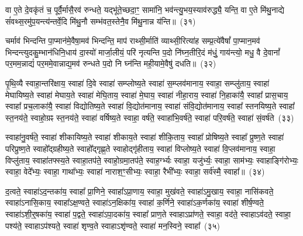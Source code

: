 वा ए॒ते दे॒वकृ॑तं च॒ पूर्वै॒र्मासै॒रव॑ रुन्धते॒ यद्भू॑ते॒च्छदा॒ꣳ॒ सामा॑नि॒ भव॑न्त्यु॒भय॒स्याव॑रुद्ध्यै॒ यन्ति॒ वा ए॒ते मि॑थु॒नाद्ये सं॑वथ्स॒रमु॑प॒यन्त्य॑न्तर्वे॒दि मि॑थु॒नौ सम्भ॑वत॒स्तेनै॒व मि॑थु॒नान्न य॑न्ति॥~(३१)\ip

{\anuvakamend[{व्यृ॑द्ध॒मक्षो॑धुका॒स्ताꣳ समां᳚ प्र॒जाः प॑र॒मामे॒व च॑ त्रि॒ꣳ॒शच्च॑}]}

चर्माव॑ भिन्दन्ति पा॒प्मान॑मे॒वैषा॒मव॑ भिन्दन्ति॒ माप॑ राथ्सी॒र्माति॑ व्याथ्सी॒रित्या॑ह सम्प्र॒त्ये॑वैषां᳚ पा॒प्मान॒मव॑ भिन्दन्त्युदकु॒म्भान॑धिनि॒धाय॑ दा॒स्यो॑ मार्जा॒लीयं॒ परि॑ नृत्यन्ति प॒दो नि॑घ्न॒तीरि॒दं म॑धुं॒ गाय॑न्त्यो॒ मधु॒ वै दे॒वानां᳚ पर॒मम॒न्नाद्यं॑ पर॒ममे॒वान्नाद्य॒मव॑ रुन्धते प॒दो नि घ्न॑न्ति मही॒यामे॒वैषु॑ दधति॥~(३२)\ip

{\anuvakamend[{चर्मैका॒न्नप॑ञ्चा॒शत्}]}%

पृ॒थि॒व्यै स्वाहा॒न्तरि॑क्षाय॒ स्वाहा॑ दि॒वे स्वाहा॑ सम्प्लोष्य॒ते स्वाहा॑ स॒म्प्लव॑मानाय॒ स्वाहा॒ सम्प्लु॑ताय॒ स्वाहा॑ मेघायिष्य॒ते स्वाहा॑ मेघाय॒ते स्वाहा॑ मेघि॒ताय॒ स्वाहा॑ मे॒घाय॒ स्वाहा॑ नीहा॒राय॒ स्वाहा॑ नि॒हाका॑यै॒ स्वाहा᳚ प्रास॒चाय॒ स्वाहा᳚ प्रच॒लाका॑यै॒ स्वाहा॑ विद्योतिष्य॒ते स्वाहा॑ वि॒द्योत॑मानाय॒ स्वाहा॑ संवि॒द्योत॑मानाय॒ स्वाहा᳚ स्तनयिष्य॒ते स्वाहा᳚ स्त॒नय॑ते॒ स्वाहो॒ग्रꣴ स्त॒नय॑ते॒ स्वाहा॑ वर्\mbox{}षिष्य॒ते स्वाहा॒ वर्\mbox{}ष॑ते॒ स्वाहा॑भि॒वर्\mbox{}ष॑ते॒ स्वाहा॑ परि॒वर्\mbox{}ष॑ते॒ स्वाहा॑ सं॒वर्\mbox{}ष॑ते~(३३)\ip

स्वाहा॑नु॒वर्\mbox{}ष॑ते॒ स्वाहा॑ शीकायिष्य॒ते स्वाहा॑ शीकाय॒ते स्वाहा॑ शीकि॒ताय॒ स्वाहा᳚ प्रोषिष्य॒ते स्वाहा᳚ प्रुष्ण॒ते स्वाहा॑ परिप्रुष्ण॒ते स्वाहो᳚द्ग्रहीष्य॒ते स्वाहो᳚द्गृह्ण॒ते स्वाहोद्गृ॑हीताय॒ स्वाहा॑ विप्लोष्य॒ते स्वाहा॑ वि॒प्लव॑मानाय॒ स्वाहा॒ विप्लु॑ताय॒ स्वाहा॑तफ्स्य॒ते स्वाहा॒तप॑ते॒ स्वाहो॒ग्रमा॒तप॑ते॒ स्वाह॒र्ग्भ्यः स्वाहा॒ यजु॑र्भ्यः॒ स्वाहा॒ साम॑भ्यः॒ स्वाहाङ्गि॑रोभ्यः॒ स्वाहा॒ वेदे᳚भ्यः॒ स्वाहा॒ गाथा᳚भ्यः॒ स्वाहा॑ नाराश॒ꣳ॒सीभ्यः॒ स्वाहा॒ रैभी᳚भ्यः॒ स्वाहा॒ सर्व॑स्मै॒ स्वाहा᳚॥~(३४)\ip

{\anuvakamend[{सं॒ वर्\mbox{}ष॑ते॒ रैभी᳚भ्यः॒ स्वाहा॒ द्वे च॑}]}%

द॒त्वते॒ स्वाहा॑\-ऽद॒न्तका॑य॒ स्वाहा᳚ प्रा॒णिने॒ स्वाहा᳚\-ऽप्रा॒णाय॒ स्वाहा॒ मुख॑वते॒ स्वाहा॑\-ऽमु॒खाय॒ स्वाहा॒ नासि॑कवते॒ स्वाहा॑\-ऽनासि॒काय॒ स्वाहा᳚\-ऽक्ष॒ण्वते॒ स्वाहा॑\-ऽन॒क्षिका॑य॒ स्वाहा॑ क॒र्णिने॒ स्वाहा॑\-ऽक॒र्णका॑य॒ स्वाहा॑ शीर्\mbox{}ष॒ण्वते॒ स्वाहा॑\-ऽ\-शी॒र्॒\mbox{}षका॑य॒ स्वाहा॑ प॒द्वते॒ स्वाहा॑\-ऽपा॒दका॑य॒ स्वाहा᳚ प्राण॒ते स्वाहा\-ऽप्रा॑णते॒ स्वाहा॒ वद॑ते॒ स्वाहा\-ऽव॑दते॒ स्वाहा॒ पश्य॑ते॒ स्वाहा\-ऽप॑श्यते॒ स्वाहा॑ शृण्व॒ते स्वाहा\-ऽशृ॑ण्वते॒ स्वाहा॑ मन॒स्विने॒ स्वाहा᳚~(३५)\ip

